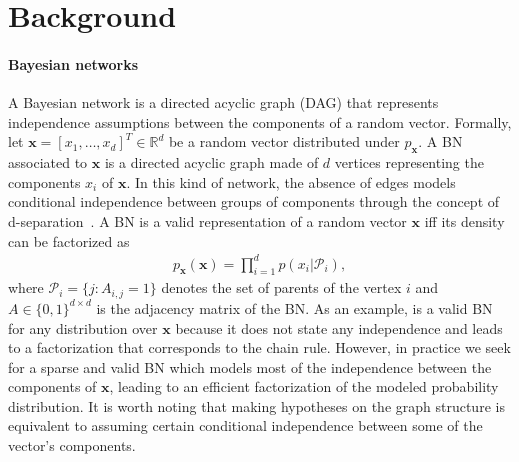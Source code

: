 \section{Background}

\paragraph{Bayesian networks}
A Bayesian network is a directed acyclic graph (DAG) that represents independence assumptions between the components of a random vector. Formally, let $\mathbf{x} = \left[x_1, \hdots, x_d\right]^T \in \mathbb{R}^d$ be a random vector distributed under $p_{\mathbf{x}}$. A BN associated to $\mathbf{x}$ is a directed acyclic graph made of $d$ vertices representing the components $x_i$ of $\mathbf{x}$. In this kind of network, the absence of edges models conditional independence between groups of components through the concept of d-separation~\citep{d-separation}. A BN is a valid representation of a random vector $\mathbf{x}$ iff its density can be factorized as
\begin{align}
    p_{\mathbf{x}}(\mathbf{x}) = \prod^d_{i=1}p(x_i|\mathcal{P}_i),\label{eq:BN-fact}
\end{align}
where  $\mathcal{P}_i = \{j: A_{i,j} = 1 \}$ denotes the set of parents of the vertex $i$ and $A \in \{0, 1\}^{d\times d}$ is the adjacency matrix of the BN. As an example,  is a valid BN for any distribution over $\mathbf{x}$ because it does not state any independence and leads to a factorization that corresponds to the chain rule. However, in practice we seek for a sparse and valid BN which models most of the independence between the components of $\mathbf{x}$, leading to an efficient factorization of the modeled probability distribution. It is worth noting that making hypotheses on the graph structure is equivalent to assuming certain conditional independence between some of the vector's components.




